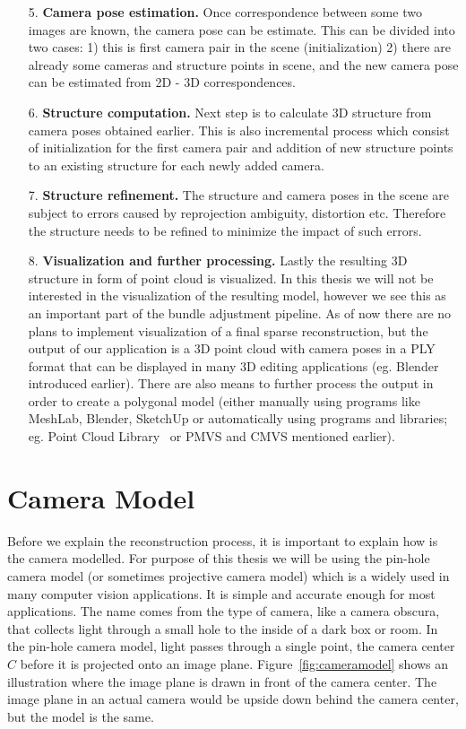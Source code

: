 \begin{itemize}
	\item[5.] \textbf{Camera pose estimation.} Once correspondence between some two images are known, the camera pose can be estimate. This can be divided into two cases: 1) this is first camera pair in the scene (initialization) 2) there are already some cameras and structure points in scene, and the new camera pose can be estimated from 2D - 3D correspondences.
	\item[6.] \textbf{Structure computation.} Next step is to calculate 3D structure from camera poses obtained earlier. This is also incremental process which consist of initialization for the first camera pair and addition of new structure points to an existing structure for each newly added camera.
	\item[7.] \textbf{Structure refinement.} The structure and camera poses in the scene are subject to errors caused by reprojection ambiguity, distortion etc. Therefore the structure needs to be refined to minimize the impact of such errors.
	\item[8.] \textbf{Visualization and further processing.} Lastly the resulting 3D structure in form of point cloud is visualized. In this thesis we will not be interested in the visualization of the resulting model, however we see this as an important part of the bundle adjustment pipeline. As of now there are no plans to implement visualization of a final sparse reconstruction, but the output of our application is a 3D point cloud with camera poses in a PLY format that can be displayed in many 3D editing applications (eg. Blender introduced earlier). There are also means to further process the output in order to create a polygonal model (either manually using programs like MeshLab, Blender, SketchUp or automatically using programs and libraries; eg. Point Cloud Library~\cite{www:pcl} or PMVS and CMVS mentioned earlier). 
\end{itemize}

\section{Camera Model}
Before we explain the reconstruction process, it is important to explain how is the camera modelled. For purpose of this thesis we will be using the pin-hole camera model (or sometimes projective camera model) which is a widely used in many computer vision applications. It is simple and accurate enough for most applications. The name comes from the type of camera, like a camera obscura, that collects light through a small hole to the inside of a dark box or room. In the pin-hole camera model, light passes through a single point, the camera center $C$ before it is projected onto an image plane. Figure~\ref{fig:cameramodel} shows an illustration where the image plane is drawn in front of the camera center. The image plane in an actual camera would be upside down behind the camera center, but the model is the same.


